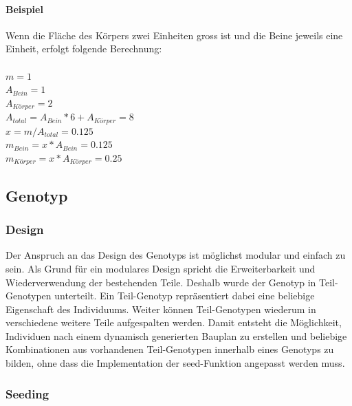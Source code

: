       \paragraph{Beispiel\label{par:MasseExample}}

        Wenn die Fläche des Körpers zwei Einheiten gross ist und die Beine jeweils eine Einheit,
        erfolgt folgende Berechnung:
        \\
        \\
        \(m = 1\) \\
        \(A_{Bein} = 1\) \\
        \(A_{Körper} = 2\) \\
        \(A_{total} = A_{Bein} * 6 + A_{Körper} = 8 \) \\
        \( x = m / A_{total} = 0.125 \) \\
        \(m_{Bein} = x * A_{Bein} = 0.125\) \\
        \(m_{Körper} = x * A_{Körper} = 0.25\) \\

    \subsection{Genotyp\label{sub:Genotype}}

      \subsubsection{Design\label{subsub:GenotypeDesign}}

        Der Anspruch an das Design des Genotyps ist möglichst modular und einfach zu sein.
        Als Grund für ein modulares Design spricht die Erweiterbarkeit und Wiederverwendung der bestehenden Teile.
        Deshalb wurde der Genotyp in Teil-Genotypen unterteilt.
        Ein Teil-Genotyp repräsentiert dabei eine beliebige Eigenschaft des Individuums.
        Weiter können Teil-Genotypen wiederum in verschiedene weitere Teile aufgespalten werden.
        Damit entsteht die Möglichkeit, Individuen nach einem dynamisch generierten Bauplan zu erstellen
        und beliebige Kombinationen aus vorhandenen Teil-Genotypen innerhalb eines Genotyps zu bilden,
        ohne dass die Implementation der seed-Funktion angepasst werden muss.

      \subsubsection{Seeding\label{subsub:GenotypeSeeding}}

